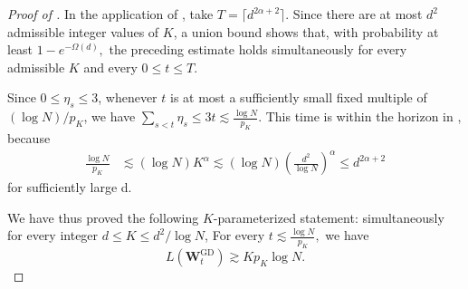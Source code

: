 \documentclass[11pt]{article}
\theoremstyle{definition}
\newcommand{\Wb}{\mathbf{W}}
\newcommand{\eps}{\varepsilon}
\begin{document}
\begin{proof}[Proof of ]
In the application of , take $T=\lceil d^{2\alpha+2}\rceil$.  Since there are at most $d^2$ admissible
integer values of $K$, a union bound shows that, with probability at least $1-e^{-\Omega(d)},$ the preceding estimate holds simultaneously for every admissible $K$ and
every $0\leq t\leq T$.

Since $0\leq\eta_s\leq3$, whenever $t$ is at most a sufficiently
small fixed multiple of $(\log N)/p_K$, we have
$
 \sum_{s<t}\eta_s\leq 3t \lesssim\frac{\log N}{p_K}.
$
This time is within the horizon in
, because
\begin{align*}
 \frac{\log N}{p_K}
 &\lesssim(\log N)K^\alpha\lesssim(\log N)\left(\frac{d^2}{\log N}\right)^\alpha
 \leq d^{2\alpha+2}
\end{align*}
for sufficiently large d.

We have thus proved the following $K$-parameterized statement: simultaneously
for every integer $d\leq K\leq d^2/\log N$,
For every $t\lesssim\frac{\log N}{p_K},$ we have
\[
 L(\Wb_t^{\mathrm{GD}})
 \gtrsim Kp_K\log N.
\]



\end{proof}
\end{document}
